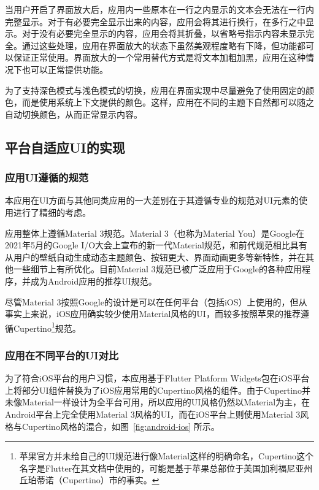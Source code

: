 当用户开启了界面放大后，应用内一些原本在一行之内显示的文本会无法在一行内完整显示。对于有必要完全显示出来的内容，应用会将其进行换行，在多行之中显示。对于没有必要完全显示的内容，应用会将其折叠，以省略号指示内容未显示完全。通过这些处理，应用在界面放大的状态下虽然美观程度略有下降，但功能都可以保证正常使用。界面放大的一个常用替代方式是将文本加粗加黑，应用在这种情况下也可以正常提供功能。

为了支持深色模式与浅色模式的切换，应用在界面实现中尽量避免了使用固定的颜色，而是使用系统上下文提供的颜色。这样，应用在不同的主题下自然都可以随之自动切换颜色，从而正常显示内容。

\subsection{平台自适应UI的实现}\label{subsec:adaptive-ui}

\subsubsection{应用UI遵循的规范}

本应用在UI方面与其他同类应用的一大差别在于其遵循专业的规范对UI元素的使用进行了精细的考虑。

应用整体上遵循Material 3规范\cite{MaterialDesign}。Material 3（也称为Material You）是Google在2021年5月的Google I/O大会上宣布的新一代Material规范，和前代规范相比具有从用户的壁纸自动生成动态主题颜色、按钮更大、界面动画更多等新特性，并在其他一些细节上有所优化。目前Material 3规范已被广泛应用于Google的各种应用程序，并成为Android应用的推荐UI规范。

尽管Material 3按照Google的设计是可以在任何平台（包括iOS）上使用的，但从事实上来说，iOS应用确实较少使用Material风格的UI，而较多按照苹果的推荐遵循Cupertino\footnote{苹果官方并未给自己的UI规范进行像Material这样的明确命名，Cupertino这个名字是Flutter在其文档中使用的，可能是基于苹果总部位于美国加利福尼亚州丘珀蒂诺（Cupertino）市的事实。}规范。

\subsubsection{应用在不同平台的UI对比}

为了符合iOS平台的用户习惯，本应用基于Flutter Platform Widgets包在iOS平台上将部分UI组件替换为了iOS应用常用的Cupertino风格的组件。由于Cupertino并未像Material一样设计为全平台可用，所以应用的UI风格仍然以Material为主，在Android平台上完全使用Material 3风格的UI，而在iOS平台上则使用Material 3风格与Cupertino风格的混合，如图~\ref{fig:android-ios} 所示。

